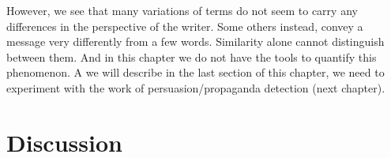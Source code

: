 However, we see that many variations of terms do not seem to carry any differences in the perspective of the writer. Some others instead, convey a message very differently from a few words. Similarity alone cannot distinguish between them. And in this chapter we do not have the tools to quantify this phenomenon. A we will describe in the last section of this chapter, we need to experiment with the work of persuasion/propaganda detection (next chapter).









\section{\statusgreen Discussion}
\label{sec:cgs_findings}

